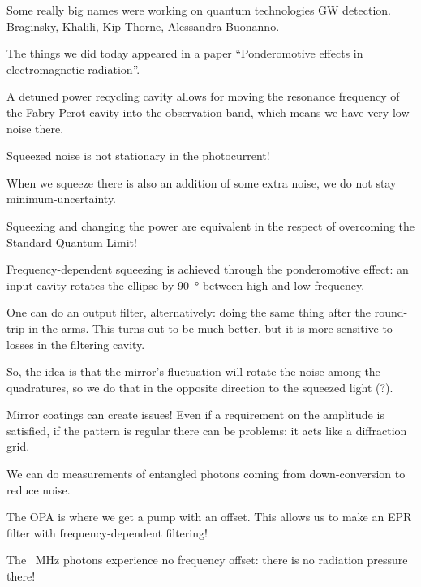 \documentclass[main.tex]{subfiles}
\begin{document}
Some really big names were working on quantum technologies GW detection. 
Braginsky, Khalili, Kip Thorne, Alessandra Buonanno. 

The things we did today appeared in a paper ``Ponderomotive effects in electromagnetic radiation''. 

A detuned power recycling cavity allows for moving the resonance 
frequency of the Fabry-Perot cavity into the observation band, which
means we have very low noise there. 

Squeezed noise is not stationary in the photocurrent! 

When we squeeze there is also an addition of some extra noise,
we do not stay minimum-uncertainty. 

Squeezing and changing the power are equivalent in the respect of overcoming the Standard Quantum Limit! 

Frequency-dependent squeezing is achieved through the ponderomotive 
effect: an input cavity rotates the ellipse by \SI{90}{\degree} between high and low frequency.

One can do an output filter, alternatively: doing the same thing 
after the round-trip in the arms. 
This turns out to be much better, but it is more sensitive to losses in the filtering cavity. 


So, the idea is that the mirror's fluctuation will rotate the noise among the quadratures, so we do that in the opposite direction to the squeezed light (?). 

Mirror coatings can create issues! Even if a requirement on the amplitude is satisfied, if the pattern is regular there can be problems: it acts like a diffraction grid. 


We can do measurements of entangled photons coming from down-conversion to reduce noise. 

The OPA is where we get a pump with an offset. 
This allows us to make an EPR filter with frequency-dependent filtering! 

The \SI{}{MHz} photons experience no frequency offset: there is no radiation pressure there! 
\end{document}
